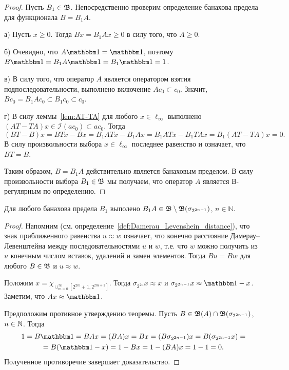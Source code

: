 \begin{proof}
	Пусть $B_1\in \mathfrak{B}$.
	Непосредственно проверим определение банахова предела для функционала $B = B_1 A$.

	а) Пусть $x\geq 0$.
	Тогда $Bx = B_1 Ax \geq 0$ в силу того, что $A\geq 0$.

	б) Очевидно, что $A\mathbbm 1 = \mathbbm 1$, поэтому $B\mathbbm 1 = B_1 A \mathbbm 1 = B_1 \mathbbm 1 = 1$.

	в) В силу того, что оператор $A$ является оператором взятия подпоследовательности,
	выполнено включение $Ac_0 \subset c_0$.
	Значит, $Bc_0 = B_1 A c_0 \subset B_1 c_0 \subset c_0$.

	г) В силу леммы~\ref{lem:AT-TA} для любого $x\in \ell_\infty$ выполнено $(AT-TA)x \in \mathcal{I}(ac_0) \subset ac_0$.
	Тогда
	\begin{equation}
		(BT-B)x = BTx - Bx = B_1 ATx - B_1 A x = B_1 ATx - B_1 T A x = B_1 (AT -  T A) x = 0
		.
	\end{equation}
	В силу произвольности выбора $x\in \ell_\infty$ последнее равенство и означает, что $BT=B$.

	Таким образом, $B = B_1 A$ действительно является банаховым пределом.
	В силу произвольности выбора $B_1 \in \mathfrak{B}$ мы получаем,
	что оператор $A$ является В-регулярным по определению.
\end{proof}

\begin{lemma}
	Для любого банахова предела $B_1$ выполено $B_1 A \in \mathfrak B \setminus \mathfrak{B} (\sigma_{2^{2n-1}})$, $n\in \mathbb N$.
\end{lemma}

\begin{proof}
	Напомним (см. определение~\ref{def:Damerau_Levenshein_distance}), что знак приближенного равенства $ u \approx w$ означает,
	что конечно расстояние Дамерау--Левенштейна между последовательностями
	$u$ и $w$,
	т.е. что $w$ можно получить из $u$ конечным числом вставок, удалений и замен элементов.
	Тогда $Bu = Bw$ для любого $B\in\mathfrak{B}$ и $u \approx w$.

	Положим $x = \chi_{\cup_{m=0}^{\infty}\left[2^{2 m}+1, 2^{2 m+1}\right]}$.
	Тогда $\sigma_{2^{2n}} x \approx x$ и $\sigma_{2^{2n-1}} x \approx \mathbbm 1 - x$.
	Заметим, что $Ax \approx \mathbbm 1$.

	Предположим противное утверждению теоремы.
	Пусть $B \in \mathfrak{B}(A) \cap \mathfrak{B} (\sigma_{2^{2n-1}})$, $n\in \mathbb{N}$.
	Тогда
	\begin{multline}
		1 = B\mathbbm1 = BAx = (BA)x = Bx =
		(B\sigma_{2^{2n-1}}) x = B (\sigma_{2^{2n-1}} x) =
		\\=
		B(\mathbbm1 -x) = 1 - Bx = 1 - (BA)x = 1-1 = 0
		.
	\end{multline}
	Полученное противоречие завершает доказательство.
\end{proof}

